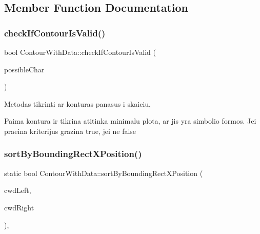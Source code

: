 \subsection{Member Function Documentation}
\mbox{\label{class_contour_with_data_a101e8ba37599c061008c6ab8812a48f8}} 
\subsubsection{\texorpdfstring{check\+If\+Contour\+Is\+Valid()}{checkIfContourIsValid()}}
{\footnotesize\ttfamily bool Contour\+With\+Data\+::check\+If\+Contour\+Is\+Valid (\begin{DoxyParamCaption}\item[{\hyperlink{class_possible_char}{Possible\+Char} \&}]{possible\+Char }\end{DoxyParamCaption})\hspace{0.3cm}{\ttfamily [inline]}}

Metodas tikrinti ar konturas panasus i skaiciu,

Paima kontura ir tikrina atitinka minimalu plota, ar jis yra simbolio formos. Jei praeina kriterijus grazina true, jei ne false \mbox{\label{class_contour_with_data_a467efdd6adb42badb28de1398b269d1f}} 
\subsubsection{\texorpdfstring{sort\+By\+Bounding\+Rect\+X\+Position()}{sortByBoundingRectXPosition()}}
{\footnotesize\ttfamily static bool Contour\+With\+Data\+::sort\+By\+Bounding\+Rect\+X\+Position (\begin{DoxyParamCaption}\item[{const \hyperlink{class_contour_with_data}{Contour\+With\+Data} \&}]{cwd\+Left,  }\item[{const \hyperlink{class_contour_with_data}{Contour\+With\+Data} \&}]{cwd\+Right }\end{DoxyParamCaption})\hspace{0.3cm}{\ttfamily [inline]}, {\ttfamily [static]}}

